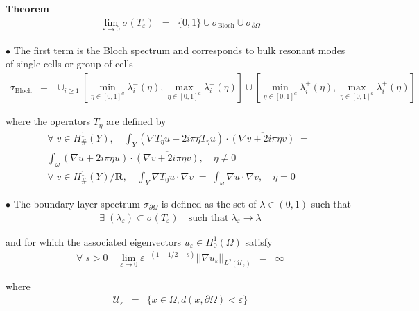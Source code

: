 \documentclass[mathserif,9pt]{beamer}
\def\e{{\varepsilon}}
\def\ds{\displaystyle}
\def\R{\mathbf R}
\begin{document}
\begin{frame}
\small{

{\bf Theorem}
\textcolor{b_bruz}{
\begin{eqnarray*}
\lim_{\e \to 0} \sigma(T_\e) &=&
\{0,1\} \cup \sigma_{\textrm{Bloch}} \cup \sigma_{\partial \Omega}
\end{eqnarray*}}
\medskip

\textcolor{b_bruz}{$\bullet$}
The first term is the Bloch spectrum and corresponds to bulk
resonant modes of single cells or group of cells
\textcolor{b_bruz}{
\begin{eqnarray*}
\sigma_{\textrm{Bloch}} &=&
\cup_{i \geq 1}
[ \min_{\eta \in [0,1]^d} \lambda_i^-(\eta), 
\max_{\eta \in [0,1]^d} \lambda_i^-(\eta) ]
\cup
[ \min_{\eta \in [0,1]^d} \lambda_i^+(\eta), 
\max_{\eta \in [0,1]^d} \lambda_i^+(\eta) ]
\end{eqnarray*}}
\medskip

where the operators $T_\eta$ are defined by
\textcolor{b_bruz}{
\begin{eqnarray*}
\forall\; v \in H^1_{\#}(Y),
\quad
\ds\int_Y 
\left( \nabla T_\eta u + 2 i \pi \eta T_\eta u \right)
\cdot
\overline{\left( \nabla v + 2 i \pi \eta v \right)}
\;=\;
\\
\ds\int_\omega 
\left( \nabla u + 2 i \pi \eta u \right)
\cdot
\overline{ \left(\nabla v + 2 i \pi \eta v \right) }, \quad \eta \neq 0
\\
\forall\; v \in H^1_{\#}(Y)/\R,
\quad
\ds\int_Y 
\nabla T_0 u 
\cdot
\overline{\nabla v}
\;=\; 
\ds\int_\omega 
\nabla u
\cdot
\overline{\nabla v}, \quad \eta = 0
\end{eqnarray*}}


}
\end{frame}
\begin{frame}
\small{




\textcolor{b_bruz}{$\bullet$}
The boundary layer spectrum $\sigma_{\partial \Omega}$ is
defined as the set of $\lambda \in (0,1)$ such that 
\textcolor{b_bruz}{
\begin{eqnarray*}
\exists\; (\lambda_\e) \subset \sigma(T_\e) \quad\textrm{such that}\; \lambda_\e \to \lambda
\end{eqnarray*}}
\medskip

and for which the associated eigenvectors $u_\e \in H^1_0(\Omega)$ satisfy
\textcolor{b_bruz}{
\begin{eqnarray*}
\forall\; s > 0\quad 
\lim_{\e \to 0}
\e^{-(1 - 1/2 + s)} ||\nabla u_\e||_{L^2({\mathcal U}_\e)}
&=& \infty
\end{eqnarray*}}

where 
\begin{eqnarray*}
{\mathcal U}_\e &=& \{ x \in \Omega, d(x, \partial \Omega) < \e\}
\end{eqnarray*}

}
\end{frame}
\end{document}
